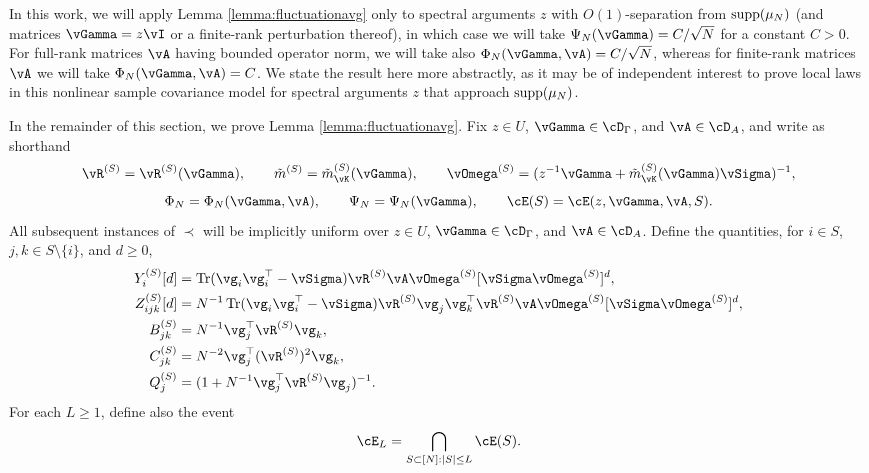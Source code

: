 In this work, we will apply Lemma \ref{lemma:fluctuationavg} only to
spectral arguments $z$ with $O(1)$-separation from $\mathrm{supp}({\mu_N})$
(and matrices $\vGamma=z\vI$ or a finite-rank perturbation thereof), in which
case we will take $\Psi_N(\vGamma)=C/\sqrt{N}$ for a constant $C>0$.
For full-rank matrices $\vA$ 
having bounded operator norm, we will take also
$\Phi_N(\vGamma,\vA)=C/\sqrt{N}$, whereas for finite-rank matrices $\vA$
we will take $\Phi_N(\vGamma,\vA)=C$. We state the result
here more abstractly, as it may be of independent interest to prove local
laws in this nonlinear sample covariance model for spectral arguments $z$
that approach $\mathrm{supp}({\mu_N})$.

In the remainder of this section, we prove Lemma \ref{lemma:fluctuationavg}.
Fix $z \in U$, $\vGamma \in \cD_\Gamma$, and $\vA \in \cD_A$, and
write as shorthand
\[\vR^{(S)}=\vR^{(S)}(\vGamma),\qquad
\tilde m^{(S)}=\tilde m_{\vK}^{(S)}(\vGamma), \qquad
\vOmega^{(S)}=(z^{-1}\vGamma+\tilde m_{\vK}^{(S)}(\vGamma)\vSigma)^{-1},\]
\[\Phi_N=\Phi_N(\vGamma,\vA), \qquad
\Psi_N=\Psi_N(\vGamma),\qquad
\cE(S)=\cE(z,\vGamma,\vA,S).\]
All subsequent instances of $\prec$ will be
implicitly uniform over $z \in U$,
$\vGamma \in \cD_\Gamma$, and $\vA \in \cD_A$.
Define the quantities, for $i \in S$, $j,k \in S \setminus \{i\}$, and
$d \geq 0$,
\begin{align*}
Y_i^{(S)}[d]&=\Tr (\vg_i\vg_i^\top-\vSigma)\vR^{(S)}\vA\vOmega^{(S)}
[\vSigma\vOmega^{(S)}]^d,\\
Z_{ijk}^{(S)}[d]&=N^{-1}\Tr (\vg_i\vg_i^\top-\vSigma)\vR^{(S)}\vg_j\vg_k^\top
\vR^{(S)}\vA\vOmega^{(S)}[\vSigma\vOmega^{(S)}]^d,\\
B_{jk}^{(S)}&=N^{-1}\vg_j^\top\vR^{(S)}\vg_k,\\
C_{jk}^{(S)}&=N^{-2}\vg_j^\top(\vR^{(S)})^2\vg_k,\\
Q_j^{(S)}&=(1+N^{-1} \vg_j^\top \vR^{(S)} \vg_j)^{-1}.
\end{align*}
For each $L \geq 1$, define also the event
\begin{equation}\label{eq:EL}
\cE_L=\bigcap_{S \subset [N]:|S| \leq L} \cE(S).
\end{equation}

